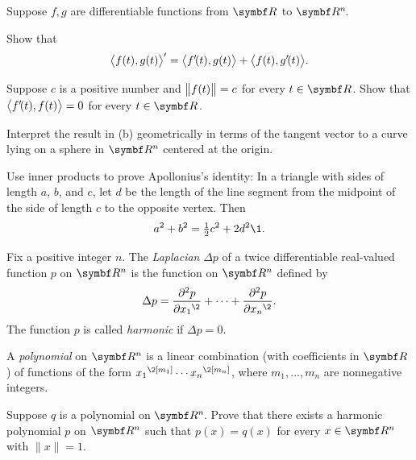 \begin{exercises}
\exercise
Suppose $f, g$ are differentiable functions from $\R{}$ to $\RR{n}$.
\begin{subtheorem}
\item
Show that
\[
\ip[\big]{ f(t), g(t) }' = \ip[\big]{ f' \! (t), g(t)} + \ip[\big]{f(t), g' \! (t) }.
\]
\item
Suppose $c$ is a positive number and $\norm[\big]{f(t)} = c$ for every $t \in \R{}$. Show that $\ip[\big]{ f' \! (t), f(t) } = 0$ for every $t \in \R{}$.
\item
Interpret the result in (b) geometrically in terms of the tangent vector to a curve lying on a sphere in $\R{n}$ centered at the origin.
\end{subtheorem}


\exercise
Use inner products to prove Apollonius's identity: In a triangle with sides of length $a$, $b$, and $c$, let $d$ be the length of the line segment from the midpoint of the side of length $c$ to the opposite vertex. Then \label{Apollonius}
\[
a^2 + b^2 = \tfrac{1}{2} c^2 + 2d^2\1.
\]
\vspace{-.45in}


\exercise
Fix a positive integer $n$. The \emph{Laplacian} $\Delta p$ of a twice differentiable real-valued function $p$ on $\R{n}$ is the function on $\R{n}$ defined by \label{harmonic}
\[
\Delta p = \frac{ \partial^2 p }{\partial {x_1}^{\2}} + \dots + \frac{ \partial^2 p }{\partial {x_n}^{\2}}.
\]
The function $p$ is called \emph{harmonic} if $\Delta p = 0$.

A \emph{polynomial} on $\R{n}$ is a linear combination (with coefficients in $\R{}$) of functions of the form
${x_1}^{\2[m_1]} \dotsm {x_n}^{\2[m_n]}$, where $m_1, \dots, m_n$ are nonnegative integers.

Suppose $q$ is a polynomial on $\RR{n}$. Prove that there exists a harmonic polynomial $p$ on $\R{n}$ such that $p(x) = q(x)$ for every $x \in \R{n}$ with $\|x\| = 1$.


\end{exercises}

